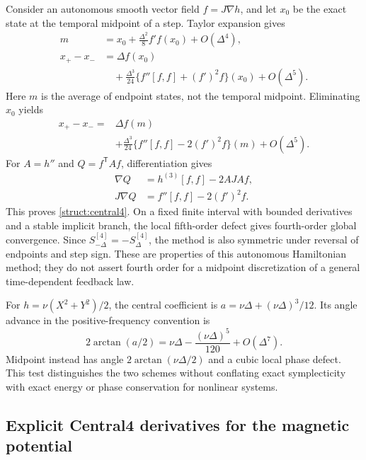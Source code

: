 Consider an autonomous smooth vector field $f=J\nabla h$, and let $x_0$ be the exact state at the temporal midpoint of a step. Taylor expansion gives
\begin{equation}\label{ss:central-taylor}
\begin{aligned}
 m&=x_0+\tfrac{\Delta^2}{8}f'f(x_0)+O(\Delta^4),\\
 x_+-x_-&=\Delta f(x_0)\\
   &\quad+\tfrac{\Delta^3}{24}
         \{f''[f,f]+(f')^2f\}(x_0)+O(\Delta^5).
\end{aligned}
\end{equation}
Here $m$ is the average of endpoint states, not the temporal midpoint. Eliminating $x_0$ yields
\begin{equation}\label{ss:central-correction}
\begin{aligned}
 x_+-x_-={}&\Delta f(m)\\
 &+\tfrac{\Delta^3}{24}\{f''[f,f]-2(f')^2f\}(m)+O(\Delta^5).
\end{aligned}
\end{equation}
For $A=h''$ and $Q=f^{\mathsf T}Af$, differentiation gives
\[
\begin{aligned}
 \nabla Q&=h^{(3)}[f,f]-2AJA f,\\
 J\nabla Q&=f''[f,f]-2(f')^2f.
\end{aligned}
\]
This proves \eqref{struct:central4}. On a fixed finite interval with bounded derivatives and a stable implicit branch, the local fifth-order defect gives fourth-order global convergence. Since $S_{-\Delta}^{[4]}=-S_\Delta^{[4]}$, the method is also symmetric under reversal of endpoints and step sign. These are properties of this autonomous Hamiltonian method; they do not assert fourth order for a midpoint discretization of a general time-dependent feedback law.

For $h=\nu(X^2+Y^2)/2$, the central coefficient is
$a=\nu\Delta+(\nu\Delta)^3/12$.
Its angle advance in the positive-frequency convention is
\begin{equation}\label{ss:harmonic-phase}
 2\arctan(a/2)=\nu\Delta-\frac{(\nu\Delta)^5}{120}+O(\Delta^7).
\end{equation}
Midpoint instead has angle $2\arctan(\nu\Delta/2)$ and a cubic local phase defect. This test distinguishes the two schemes without conflating exact symplecticity with exact energy or phase conservation for nonlinear systems.

\subsection{Explicit Central4 derivatives for the magnetic potential}
\label{ss:central4-magnetic-section}

